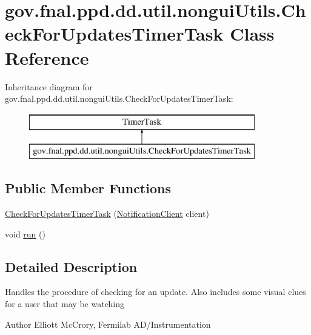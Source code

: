 \hypertarget{classgov_1_1fnal_1_1ppd_1_1dd_1_1util_1_1nonguiUtils_1_1CheckForUpdatesTimerTask}{\section{gov.\-fnal.\-ppd.\-dd.\-util.\-nongui\-Utils.\-Check\-For\-Updates\-Timer\-Task Class Reference}
\label{classgov_1_1fnal_1_1ppd_1_1dd_1_1util_1_1nonguiUtils_1_1CheckForUpdatesTimerTask}
}
Inheritance diagram for gov.\-fnal.\-ppd.\-dd.\-util.\-nongui\-Utils.\-Check\-For\-Updates\-Timer\-Task\-:\begin{figure}[H]
\begin{center}
\leavevmode
\includegraphics[height=2.000000cm]{classgov_1_1fnal_1_1ppd_1_1dd_1_1util_1_1nonguiUtils_1_1CheckForUpdatesTimerTask}
\end{center}
\end{figure}
\subsection*{Public Member Functions}
\begin{DoxyCompactItemize}
\item 
\hyperlink{classgov_1_1fnal_1_1ppd_1_1dd_1_1util_1_1nonguiUtils_1_1CheckForUpdatesTimerTask_aefaab26ab35c0077141b6c3789267fcb}{Check\-For\-Updates\-Timer\-Task} (\hyperlink{interfacegov_1_1fnal_1_1ppd_1_1dd_1_1interfaces_1_1NotificationClient}{Notification\-Client} client)
\item 
void \hyperlink{classgov_1_1fnal_1_1ppd_1_1dd_1_1util_1_1nonguiUtils_1_1CheckForUpdatesTimerTask_a96458e29ba739f0af05ba113396eb931}{run} ()
\end{DoxyCompactItemize}


\subsection{Detailed Description}
Handles the procedure of checking for an update. Also includes some visual clues for a user that may be watching

\begin{DoxyAuthor}{Author}
Elliott Mc\-Crory, Fermilab A\-D/\-Instrumentation 
\end{DoxyAuthor}


